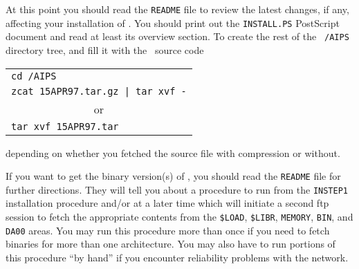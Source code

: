 At this point you should read the {\tt README} file to review the
latest changes, if any, affecting your installation of \hbox{\AIPS}.
You should print out the {\tt INSTALL.PS} PostScript document and
read at least its overview section.  To create the rest of the {\tt
/AIPS} directory tree, and fill it with the \AIPS\ source code
\vskip -10pt
\begin{center}
\begin{tabular}{l}
   {\tt cd /AIPS} \\
   {\tt zcat 15APR97.tar.gz | tar xvf -} \\
\multicolumn{1}{c}{or} \\
   {\tt tar xvf 15APR97.tar}
\end{tabular}
\end{center}
\vskip -10pt
depending on whether you fetched the source file with compression or
without.

If you want to get the binary version(s) of \AIPS, you should read the
{\tt README} file for further directions.  They will tell you about a
procedure to run from the {\tt INSTEP1} installation procedure and/or
at a later time which will initiate a second ftp session to fetch the
appropriate contents from the {\tt \$LOAD}, {\tt \$LIBR}, {\tt MEMORY},
{\tt BIN}, and {\tt DA00} areas.  You may run this procedure more than
once if you need to fetch binaries for more than one architecture.
You may also have to run portions of this procedure ``by hand'' if you
encounter reliability problems with the network.

